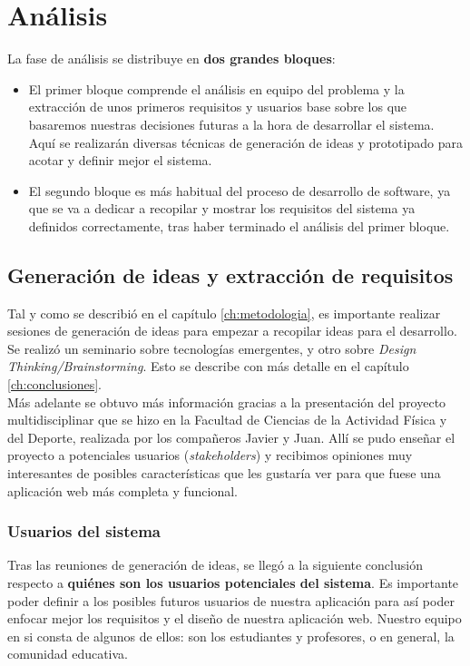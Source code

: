 \section{Análisis}
La fase de análisis se distribuye en \textbf{dos grandes bloques}:

\begin{itemize}
    \item El primer bloque comprende el análisis en equipo del problema y la extracción de unos primeros requisitos y usuarios base sobre los que basaremos nuestras decisiones futuras a la hora de desarrollar el sistema. Aquí se realizarán diversas técnicas de generación de ideas y prototipado para acotar y definir mejor el sistema.
    \item El segundo bloque es más habitual del proceso de desarrollo de software, ya que se va a dedicar a recopilar y mostrar los requisitos del sistema ya definidos correctamente, tras haber terminado el análisis del primer bloque.
\end{itemize}

\subsection{Generación de ideas y extracción de requisitos}
Tal y como se describió en el capítulo \ref{ch:metodologia}, es importante realizar sesiones de generación de ideas para empezar a recopilar ideas para el desarrollo. Se realizó un seminario sobre tecnologías emergentes, y otro sobre \textit{Design Thinking/Brainstorming}. Esto se describe con más detalle en el capítulo \ref{ch:conclusiones}.\\

Más adelante se obtuvo más información gracias a la presentación del proyecto multidisciplinar que se hizo en la Facultad de Ciencias de la Actividad Física y del Deporte, realizada por los compañeros Javier y Juan. Allí se pudo enseñar el proyecto a potenciales usuarios (\textit{stakeholders}) y recibimos opiniones muy interesantes de posibles características que les gustaría ver para que fuese una aplicación web más completa y funcional.

\subsubsection{Usuarios del sistema}
Tras las reuniones de generación de ideas, se llegó a la siguiente conclusión respecto a \textbf{quiénes son los usuarios potenciales del sistema}. Es importante poder definir a los posibles futuros usuarios de nuestra aplicación para así poder enfocar mejor los requisitos y el diseño de nuestra aplicación web. Nuestro equipo en si consta de algunos de ellos: son los estudiantes y profesores, o en general, la comunidad educativa.

